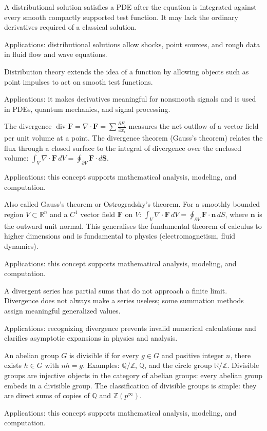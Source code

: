 A distributional solution satisfies a PDE after the equation is integrated against every smooth compactly supported test function. It may lack the ordinary derivatives required of a classical solution. \par\noindent Applications: distributional solutions allow shocks, point sources, and rough data in fluid flow and wave equations.

Distribution theory extends the idea of a function by allowing objects such as point impulses to act on smooth test functions. \par\noindent Applications: it makes derivatives meaningful for nonsmooth signals and is used in PDEs, quantum mechanics, and signal processing.

The divergence $\operatorname{div} \mathbf{F} = \nabla \cdot \mathbf{F} = \sum \frac{\partial F_i}{\partial x_i}$ measures the net outflow of a vector field per unit volume at a point. The divergence theorem (Gauss's theorem) relates the flux through a closed surface to the integral of divergence over the enclosed volume: $\int_V \nabla \cdot \mathbf{F}\,dV = \oint_{\partial V} \mathbf{F} \cdot d\mathbf{S}$. \par\noindent Applications: this concept supports mathematical analysis, modeling, and computation.

Also called Gauss's theorem or Ostrogradsky's theorem. For a smoothly bounded region $V \subset \mathbb{R}^n$ and a $C^1$ vector field $\mathbf{F}$ on $V$: $\int_V \nabla \cdot \mathbf{F}\,dV = \oint_{\partial V} \mathbf{F} \cdot \mathbf{n}\,dS$, where $\mathbf{n}$ is the outward unit normal. This generalises the fundamental theorem of calculus to higher dimensions and is fundamental to physics (electromagnetism, fluid dynamics). \par\noindent Applications: this concept supports mathematical analysis, modeling, and computation.

A divergent series has partial sums that do not approach a finite limit. Divergence does not always make a series useless; some summation methods assign meaningful generalized values. \par\noindent Applications: recognizing divergence prevents invalid numerical calculations and clarifies asymptotic expansions in physics and analysis.

An abelian group $G$ is divisible if for every $g \in G$ and positive integer $n$, there exists $h \in G$ with $nh = g$. Examples: $\mathbb{Q}/\mathbb{Z}$, $\mathbb{Q}$, and the circle group $\mathbb{R}/\mathbb{Z}$. Divisible groups are injective objects in the category of abelian groups: every abelian group embeds in a divisible group. The classification of divisible groups is simple: they are direct sums of copies of $\mathbb{Q}$ and $\mathbb{Z}(p^\infty)$. \par\noindent Applications: this concept supports mathematical analysis, modeling, and computation.


